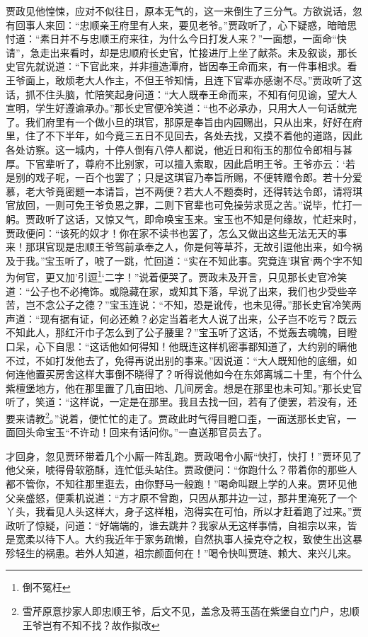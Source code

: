 \documentclass[12pt,oneside]{book}
\begin{document}
贾政见他惶悚，应对不似往日，原本无气的，这一来倒生了三分气。方欲说话，忽有回事人来回：“忠顺亲王府里有人来，要见老爷。”贾政听了，心下疑惑，暗暗思忖道：“素日并不与忠顺王府来往，为什么今日打发人来？”一面想，一面命“快请”，急走出来看时，却是忠顺府长史官，忙接进厅上坐了献茶。未及叙谈，那长史官先就说道：“下官此来，并非擅造潭府，皆因奉王命而来，有一件事相求。看王爷面上，敢烦老大人作主，不但王爷知情，且连下官辈亦感谢不尽。”贾政听了这话，抓不住头脑，忙陪笑起身问道：“大人既奉王命而来，不知有何见谕，望大人宣明，学生好遵谕承办。”那长史官便冷笑道：“也不必承办，只用大人一句话就完了。我们府里有一个做小旦的琪官，那原是奉旨由内园赐出，只从出来，好好在府里，住了不下半年，如今竟三五日不见回去，各处去找，又摸不着他的道路，因此各处访察。这一城内，十停人倒有八停人都说，他近日和衔玉的那位令郎相与甚厚。下官辈听了，尊府不比别家，可以擅入索取，因此启明王爷。王爷亦云：‘若是别的戏子呢，一百个也罢了；只是这琪官乃奉旨所赐，不便转赠令郎。若十分爱慕，老大爷竟密题一本请旨，岂不两便？若大人不题奏时，还得转达令郎，请将琪官放回，一则可免王爷负恩之罪，二则下官辈也可免操劳求觅之苦。”说毕，忙打一躬。贾政听了这话，又惊又气，即命唤宝玉来。宝玉也不知是何缘故，忙赶来时，贾政便问：“该死的奴才！你在家不读书也罢了，怎么又做出这些无法无天的事来！那琪官现是忠顺王爷驾前承奉之人，你是何等草芥，无故引逗他出来，如今祸及于我。”宝玉听了，唬了一跳，忙回道：“实在不知此事。究竟连’琪官‘两个字不知为何官，更又加’引逗\footnote{倒不冤枉}‘二字！”说着便哭了。贾政未及开言，只见那长史官冷笑道：“公子也不必掩饰。或隐藏在家，或知其下落，早说了出来，我们也少受些辛苦，岂不念公子之德？”宝玉连说：“不知，恐是讹传，也未见得。”那长史官冷笑两声道：“现有据有证，何必还赖？必定当着老大人说了出来，公子岂不吃亏？既云不知此人，那红汗巾子怎么到了公子腰里？”宝玉听了这话，不觉轰去魂魄，目瞪口呆，心下自思：“这话他如何得知！他既连这样机密事都知道了，大约别的瞒他不过，不如打发他去了，免得再说出别的事来。”因说道：“大人既知他的底细，如何连他置买房舍这样大事倒不晓得了？听得说他如今在东郊离城二十里，有个什么紫檀堡地方，他在那里置了几亩田地、几间房舍。想是在那里也未可知。”那长史官听了，笑道：“这样说，一定是在那里。我且去找一回，若有了便罢，若没有，还要来请教\footnote{雪芹原意抄家人即忠顺王爷，后文不见，盖念及蒋玉菡在紫堡自立门户，忠顺王爷岂有不知不找？故作拟改}。”说着，便忙忙的走了。贾政此时气得目瞪口歪，一面送那长史官，一面回头命宝玉“不许动！回来有话问你。”一直送那官员去了。

才回身，忽见贾环带着几个小厮一阵乱跑。贾政喝令小厮“快打，快打！”贾环见了他父亲，唬得骨软筋酥，连忙低头站住。贾政便问：“你跑什么？带着你的那些人都不管你，不知往那里逛去，由你野马一般跑！”喝命叫跟上学的人来。贾环见他父亲盛怒，便乘机说道：“方才原不曾跑，只因从那井边一过，那井里淹死了一个丫头，我看见人头这样大，身子这样粗，泡得实在可怕，所以才赶着跑了过来。”贾政听了惊疑，问道：“好端端的，谁去跳井？我家从无这样事情，自祖宗以来，皆是宽柔以待下人。大约我近年于家务疏懒，自然执事人操克夺之权，致使生出这暴殄轻生的祸患。若外人知道，祖宗颜面何在！”喝令快叫贾琏、赖大、来兴儿来。
\end{document}
